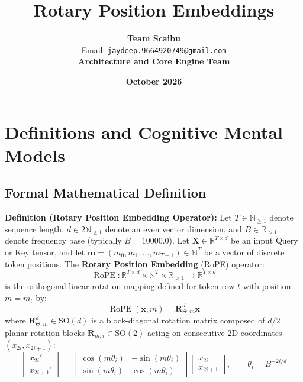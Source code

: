 \documentclass[11pt,a4paper]{article}
\title{\textbf{Rotary Position Embeddings}}
\author{\textbf{Team Scaibu} \\ \small Email: \texttt{jaydeep.9664920749@gmail.com} \\ \small \textbf{Architecture and Core Engine Team}}
\date{\textbf{October 2026}}
\theoremstyle{definition}
\begin{document}
\maketitle

\section{Definitions and Cognitive Mental Models}

\subsection{Formal Mathematical Definition}
\textbf{Definition (Rotary Position Embedding Operator):}
Let $T \in \mathbb{N}_{\ge 1}$ denote sequence length, $d \in 2\mathbb{N}_{\ge 1}$ denote an even vector dimension, and $B \in \mathbb{R}_{> 1}$ denote frequency base (typically $B = 10000.0$). Let $\mathbf{X} \in \mathbb{R}^{T \times d}$ be an input Query or Key tensor, and let $\mathbf{m} = (m_0, m_1, \dots, m_{T-1}) \in \mathbb{N}^T$ be a vector of discrete token positions.
The \textbf{Rotary Position Embedding} (RoPE) operator:
{\boldmath
\begin{equation}
\operatorname{RoPE}: \mathbb{R}^{T \times d} \times \mathbb{N}^T \times \mathbb{R}_{> 1} \longrightarrow \mathbb{R}^{T \times d}
\end{equation}
}
is the orthogonal linear rotation mapping defined for token row $t$ with position $m = m_t$ by:
{\boldmath
\begin{equation}
\operatorname{RoPE}(\mathbf{x}, m) = \mathbf{R}_{\Theta, m}^{d} \mathbf{x}
\end{equation}
}
where $\mathbf{R}_{\Theta, m}^{d} \in \mathrm{SO}(d)$ is a block-diagonal rotation matrix composed of $d/2$ planar rotation blocks $\mathbf{R}_{m, i} \in \mathrm{SO}(2)$ acting on consecutive 2D coordinates $(x_{2i}, x_{2i+1})$:
{\boldmath
\begin{equation}
\begin{bmatrix} x_{2i}' \\ x_{2i+1}' \end{bmatrix} = \begin{bmatrix} \cos(m \theta_i) & -\sin(m \theta_i) \\ \sin(m \theta_i) & \cos(m \theta_i) \end{bmatrix} \begin{bmatrix} x_{2i} \\ x_{2i+1} \end{bmatrix}, \qquad \theta_i = B^{-2i/d}
\end{equation}
}
\end{document}
